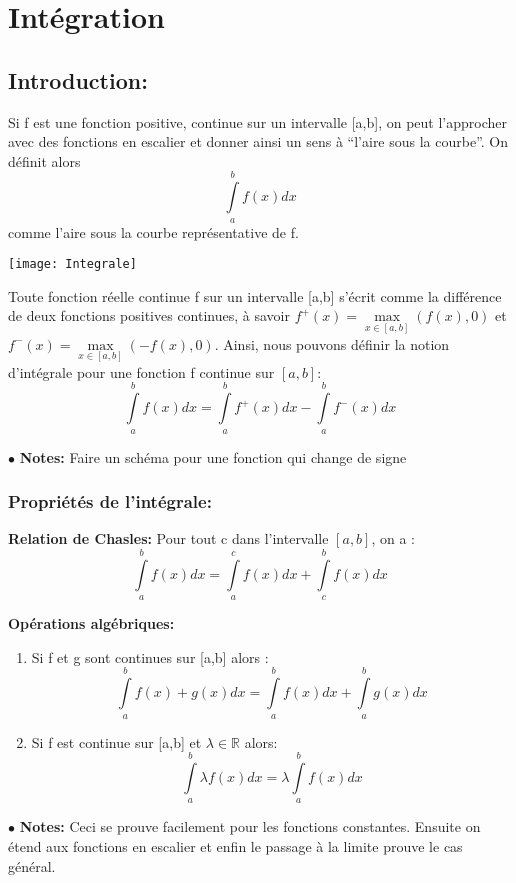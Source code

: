 \documentclass[a4paper]{article}
\theoremstyle{break}
\newcommand{\R}{\mathbb{R}}
\newcommand{\note}{$\bullet$ \textbf{Notes: }}
\begin{document}
\section{Intégration}
\subsection{Introduction: }
Si f est une fonction positive, continue sur un intervalle [a,b], on
peut l'approcher avec des fonctions en escalier et donner ainsi un
sens à ``l'aire sous la courbe''. On définit alors
\[
  \int \limits_{a}^{b} f(x) dx
\]
comme l'aire sous la courbe représentative de f.

\begin{center}
  \texttt{[image: Integrale]}
\end{center}

Toute fonction réelle continue f sur un intervalle [a,b] s'écrit comme
la différence de deux fonctions positives continues, à savoir $f^+(x)
= \max \limits_{x \in [a,b]} (f(x),0)$ et $f^-(x)
= \max \limits_{x \in [a,b]} (-f(x),0)$. Ainsi, nous pouvons définir
la notion d'intégrale pour une fonction f continue sur $[a,b]$:
\[
  \int \limits_{a}^b f(x)dx = \int \limits_a^b f^+(x) dx -
  \int \limits_a^b f^-(x) dx
\]

\note  Faire un schéma pour une fonction qui change de signe

\subsubsection{Propriétés de l'intégrale: }
\textbf{Relation de Chasles: } Pour tout c dans l'intervalle $[a,b]$,
on a :
\[
  \int \limits_a^b f(x) dx = \int \limits_a^c f(x) dx
  + \int \limits_c^b f(x) dx
\]

\textbf{Opérations algébriques: }
\begin{enumerate}[label = (\alph*)]
\item Si f et g sont continues sur [a,b] alors :
  \[
    \int \limits_a^b f(x)+g(x)dx
    = \int \limits_a^b f(x) dx + \int \limits_a^b g(x) dx
  \]
\item Si f est continue sur [a,b] et $\lambda \in \R$ alors:
  \[
    \int \limits_a^b \lambda f(x) dx
    = \lambda \int \limits_a^b f(x) dx 
  \]
\end{enumerate}

\note Ceci se prouve facilement pour les fonctions constantes. Ensuite
on étend aux fonctions en escalier et enfin le passage à la limite
prouve le cas général.
\end{document}
